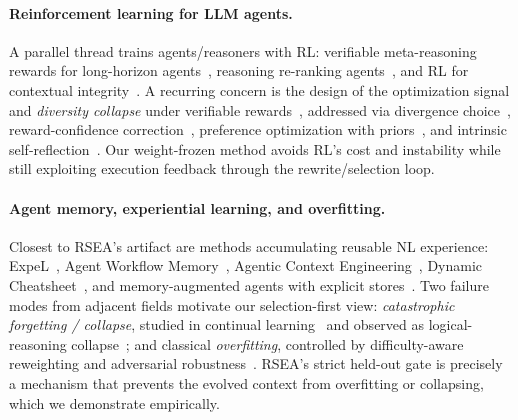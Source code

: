 \documentclass{article}
\begin{document}
\paragraph{Reinforcement learning for LLM agents.} A parallel thread trains
agents/reasoners with RL: verifiable meta-reasoning rewards for long-horizon
agents~\citep{zhang2026rlvmr}, reasoning re-ranking agents~\citep{zhang2025rearank},
and RL for contextual integrity~\citep{lan2025contextual}. A recurring concern is the
design of the optimization signal and \emph{diversity collapse} under verifiable
rewards~\citep{li2025choice}, addressed via divergence choice~\citep{li2025choice},
reward-confidence correction~\citep{li2026right}, preference optimization with
priors~\citep{lan2025mappo}, and intrinsic self-reflection~\citep{li2025inspo}. Our
weight-frozen method avoids RL's cost and instability while still exploiting execution
feedback through the rewrite/selection loop.

\paragraph{Agent memory, experiential learning, and overfitting.} Closest to RSEA's
artifact are methods accumulating reusable NL experience: ExpeL~\citep{zhao2024expel},
Agent Workflow Memory~\citep{wang2024awm}, Agentic Context
Engineering~\citep{ace2025}, Dynamic Cheatsheet~\citep{suzgun2025dc}, and
memory-augmented agents with explicit stores~\citep{packer2023memgpt,
zeng2025janusvln}. Two failure modes from adjacent fields motivate our selection-first
view: \emph{catastrophic forgetting / collapse}, studied in continual
learning~\citep{chen-zeng-2025-prototype} and observed as logical-reasoning
collapse~\citep{zhang2026logical}; and classical \emph{overfitting}, controlled by
difficulty-aware reweighting and adversarial
robustness~\citep{zhou2022understanding, zhou2024boosting, zhou2024adversarial}.
RSEA's strict held-out gate is precisely a mechanism that prevents the evolved context
from overfitting or collapsing, which we demonstrate empirically.
\end{document}
